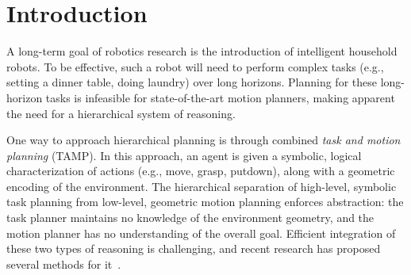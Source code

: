 \section{Introduction}
A long-term goal of robotics research is the introduction of intelligent household robots.
To be effective, such a robot will need to perform complex tasks (e.g., setting a dinner table, doing laundry)
over long horizons. Planning for these long-horizon tasks is infeasible
for state-of-the-art motion planners, making apparent the need
for a hierarchical system of reasoning.

One way to approach hierarchical planning is through combined \emph{task and motion planning} (TAMP). In this
approach, an agent is given a symbolic, logical characterization of actions (e.g., move, grasp,
putdown), along with a geometric encoding of the environment. The hierarchical separation of high-level, symbolic task planning
from low-level, geometric motion planning enforces abstraction:
the task planner maintains no knowledge of the environment geometry, and the
motion planner has no understanding of the overall goal.
Efficient integration of these two types of reasoning is challenging, and recent research has
proposed several methods for it~\cite{srivastava2014combined, kaelbling2011hierarchical,
lagriffoul2014orientation, GarrettWAFR14, dornhege2012semantic}.

